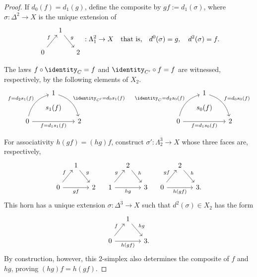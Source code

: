 \begin{proof}
	If $d_0(f)=d_1(g)$, define the composite by $gf:=d_1(\sigma)$, where
	$\sigma:\Delta^2\to X$ is the unique extension of
	\[\begin{tikzcd}[column sep=small]
		& 1 \arrow[rd, "g"] & \\
		0 \arrow[ru, "f"] & & 2
	\end{tikzcd}: \Lambda^2_1 \to X
	\quad \text{that is,}\quad d^0(\sigma) = g, \quad d^2(\sigma) = f. \]

	The laws $f\circ\identity_C=f$ and $\identity_{C'}\circ f=f$ are
	witnessed, respectively, by the following elements of $X_2$.
	\[ \begin{tikzcd}[row sep=large]
		& 1 \arrow[rd, bend left, "{\identity_{C'} = d_0 s_1(f)}"] & \\
		0 \arrow[rr, "{}" name=A, "{f = d_1 s_1(f)}"'] \arrow[ru, bend left, "{f = d_2 s_1(f)}"] & & 2 \arrow[phantom, from=1-2, to=A, "{s_1(f)}" description]
	\end{tikzcd} \quad \begin{tikzcd}[row sep=large]
		& 1 \arrow[rd, bend left, "{f = d_0 s_0(f)}"] & \\
		0 \arrow[rr, "{}" name=A, "{f = d_1 s_0(f)}"'] \arrow[ru, bend left, "{\identity_C = d_2 s_0(f)}"] & & 2 \arrow[phantom, from=1-2, to=A, "{s_0(f)}" description]
	\end{tikzcd}\]

	For associativity $h(gf)=(hg)f$, construct
	$\sigma':\Lambda^3_2\to X$ whose three faces are, respectively,
	\[\begin{tikzcd}[column sep=small]
		& 1 \arrow[rd, "g"] & \\
		0 \arrow[ru, "f"] \arrow[rr, "gf"'] & & 2
	\end{tikzcd} \quad \begin{tikzcd}[column sep=small]
		& 2 \arrow[rd, "h"] & \\
		1 \arrow[ru, "g"] \arrow[rr, "hg"'] & & 3
	\end{tikzcd} \quad \begin{tikzcd}[column sep=small]
		& 2 \arrow[rd, "h"] & \\
		0 \arrow[ru, "gf"] \arrow[rr, "h(gf)"'] & & 3.
	\end{tikzcd}\]
	This horn has a unique extension $\sigma:\Delta^3\to X$ such that
	$d^2(\sigma)\in X_2$ has the form
	\[\begin{tikzcd}[column sep=small]
		& 1 \arrow[rd, "hg"] & \\
		0 \arrow[ru, "f"] \arrow[rr, "h(gf)"'] & & 3.
	\end{tikzcd} \]
	By construction, however, this $2$-simplex also determines the composite
	of $f$ and $hg$, proving $(hg)f=h(gf)$.


\end{proof}
